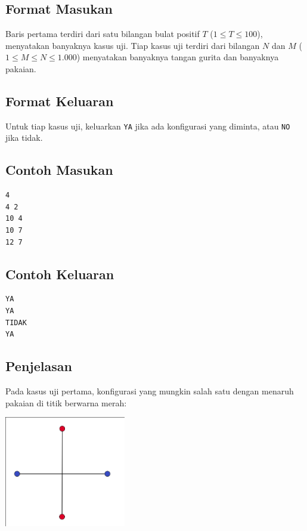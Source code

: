 \documentclass{article}
\begin{document}
\subsection*{Format Masukan}
Baris pertama terdiri dari satu bilangan bulat positif $T$ ($1 \leq T \leq 100$), menyatakan banyaknya kasus uji.
Tiap kasus uji terdiri dari bilangan $N$ dan $M$ ($1 \leq M \leq N \leq 1.000$) menyatakan banyaknya tangan gurita dan banyaknya pakaian.

\subsection*{Format Keluaran}
Untuk tiap kasus uji, keluarkan \lstinline{YA} jika ada konfigurasi yang diminta, atau \lstinline{NO} jika tidak.

\begin{multicols}{2}
\subsection*{Contoh Masukan}
\begin{lstlisting}
4
4 2
10 4
10 7
12 7
\end{lstlisting}
\columnbreak
\subsection*{Contoh Keluaran}
\begin{lstlisting}
YA
YA
TIDAK
YA
\end{lstlisting}
\vfill
\null
\end{multicols}

\pagebreak

\subsection*{Penjelasan}
Pada kasus uji pertama, konfigurasi yang mungkin salah satu dengan menaruh pakaian di titik berwarna merah:

\includegraphics[width=200px]{sample-1}
\end{document}
